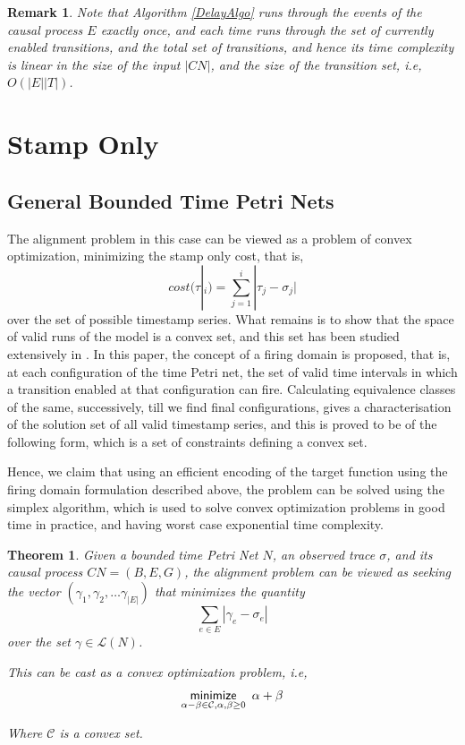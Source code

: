 \documentclass{article}
\newtheorem{theorem}{Theorem}
\newtheorem{remark}{Remark}
\theoremstyle{Definition}
\theoremstyle{definition}
\begin{document}
	\begin{remark} Note that Algorithm \ref{DelayAlgo} runs through the events of the causal process $E$ exactly once, and each time runs through the set of currently enabled transitions, and the total set of transitions, and hence its time complexity is linear in the size of the input $|CN|$, and the size of the transition set, i.e, $O(|E||T|)$. 
	\end{remark}
	
	\section{Stamp Only} 
	
	\subsection{General Bounded Time Petri Nets}
	The alignment problem in this case can be viewed as a problem of convex optimization, minimizing the stamp only cost, that is, $$cost(\tau|_i) = \sum_{j = 1}^{i} |\tau_j - \sigma_j|$$ over the set of possible timestamp series. 
	What remains is to show that the space of valid runs of the model is a convex set, and this set has been studied extensively in \cite{BM82}. 
	In this paper, the concept of a firing domain is proposed, that is, at each configuration of the time Petri net, the set of valid time intervals in which a transition enabled at that configuration can fire. 
	Calculating equivalence classes of the same, successively, till we find final configurations, gives a characterisation of the solution set of all valid timestamp series, and this is proved to be of the following form, which is a set of constraints defining a convex set. 
	
	Hence, we claim that using an efficient encoding of the target function using the firing domain formulation described above, the problem can be solved using the simplex algorithm, which is used to solve convex optimization problems in good time in practice, and having worst case exponential time complexity. 
	
	\begin{theorem}\label{convexset}
		Given a bounded time Petri Net $N$, an observed trace $\sigma$, and its causal process $CN = (B, E, G)$, the alignment problem can be viewed as seeking the vector $(\gamma_1, \gamma_2, \dots \gamma_{|E|})$ that minimizes the quantity $$\sum_{e \in E} |\gamma_e - \sigma_e|$$ over the set $\gamma \in \mathcal{L}(N)$. 
		
		This can be cast as a convex optimization problem, i.e, $$\underset{\alpha - \beta \in \mathcal{C}, \alpha, \beta \geq 0}{\mathsf{minimize}} \hspace{0.5em} \alpha + \beta  $$
		
		Where $\mathcal{C}$ is a convex set. 
	\end{theorem}
	
\end{document}

